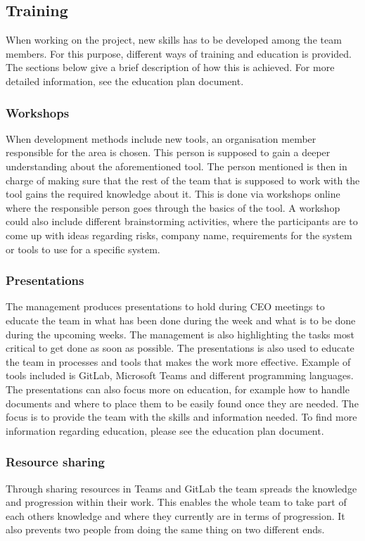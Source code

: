 \subsection{Training}
When working on the project, new skills has to be developed among the team members. For this purpose, different ways of training and education is provided. The sections below give a brief description of how this is achieved. For more detailed information, see the education plan document. 
\subsubsection{Workshops}
When development methods include new tools, an organisation member responsible for the area is chosen. This person is supposed to gain a deeper understanding about the aforementioned tool. The person mentioned is then in charge of making sure that the rest of the team that is supposed to work with the tool gains the required knowledge about it. This is done via workshops online where the responsible person goes through the basics of the tool.  A workshop could also include different brainstorming activities, where the participants are to come up with ideas regarding risks, company name, requirements for the system or tools to use for a specific system. 

\subsubsection{Presentations}
The management produces presentations to hold during CEO meetings to educate the team in what has been done during the week and what is to be done during the upcoming weeks. The management is also highlighting the tasks most critical to get done as soon as possible. The presentations is also used to educate the team in processes and tools that makes the work more effective. Example of tools included is GitLab, Microsoft Teams and different programming languages. The presentations can also focus more on education, for example how to handle documents and where to place them to be easily found once they are needed. The focus is to provide the team with the skills and information needed. To find more information regarding education, please see the education plan document. 

\subsubsection{Resource sharing}
Through sharing resources in Teams and GitLab the team spreads the knowledge and progression within their work. This enables the whole team to take part of each others knowledge and where they currently are in terms of progression. It also prevents two people from doing the same thing on two different ends. 

